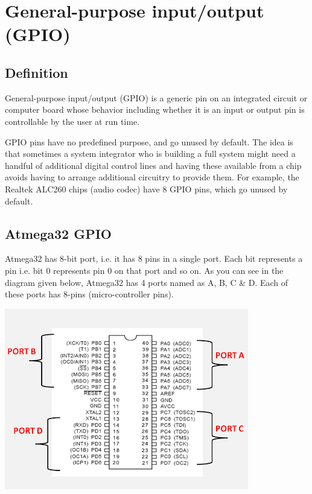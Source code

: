 \section{General-purpose input/output (GPIO)}


\subsection{Definition}
General-purpose input/output (GPIO) is a generic pin on an integrated circuit or computer board whose behavior including whether it is an input or output pin is controllable by the user at run time.

GPIO pins have no predefined purpose, and go unused by default. The idea is that sometimes a system integrator who is building a full system might need a handful of additional digital control lines and having these available from a chip avoids having to arrange additional circuitry to provide them. For example, the Realtek ALC260 chips (audio codec) have 8 GPIO pins, which go unused by default.


\subsection{Atmega32 GPIO}
Atmega32 has 8-bit port, i.e. it has 8 pins in a single port. Each bit represents a pin i.e. bit 0 represents pin 0 on that port and so on. As you can see in the diagram given below, Atmega32 has 4 ports named as A, B, C \& D. Each of these ports has 8-pins (micro-controller pins).\\

\centerline{
	\includegraphics[width=0.8\textwidth]{overview/images/gpio.png}
}


